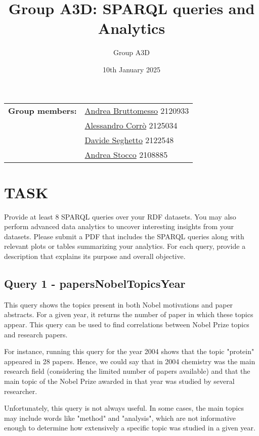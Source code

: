 \documentclass{article}
\title{Group A3D: SPARQL queries and Analytics}
\author{Group A3D}
\date{10th January 2025}
\begin{document}
\maketitle

\begin{tabular}{@{}ll}
	\textbf{Group members:}
	 & \href{mailto:andrea.bruttomesso.1@studenti.unipd.it}{Andrea Bruttomesso} 2120933 \\
	 & \href{mailto:alessandro.corro.1@studenti.unipd.it}{Alessandro Corr\`o} 2125034   \\
	 & \href{mailto:davide.seghetto@studenti.unipd.it}{Davide Seghetto} 2122548         \\
	 & \href{mailto:andrea.stocco.8@studenti.unipd.it}{Andrea Stocco} 2108885           \\
\end{tabular}


\section*{TASK}
Provide at least 8 SPARQL queries over your RDF datasets. You may also perform advanced data analytics to uncover interesting insights from your datasets. Please submit a PDF that includes the SPARQL queries along with relevant plots or tables summarizing your analytics. For each query, provide a description that explains its purpose and overall objective.

\subsection*{Query 1 - papersNobelTopicsYear}
This query shows the topics present in both Nobel motivations and paper abstracts.
For a given year, it returns the number of paper in which these topics appear.
This query can be used to find correlations between Nobel Prize topics and research
papers.

For instance, running this query for the year 2004 shows that the topic "protein"
appeared in 28 papers. Hence, we could say that in 2004 chemistry was the main
research field (considering the limited number of papers available) and that the
main topic of the Nobel Prize awarded in that year was studied by several
researcher.

Unfortunately, this query is not always useful. In some cases, the
main topics may include words like "method" and "analysis", which are not
informative enough to determine how extensively a specific topic was studied
in a given year.
\end{document}

